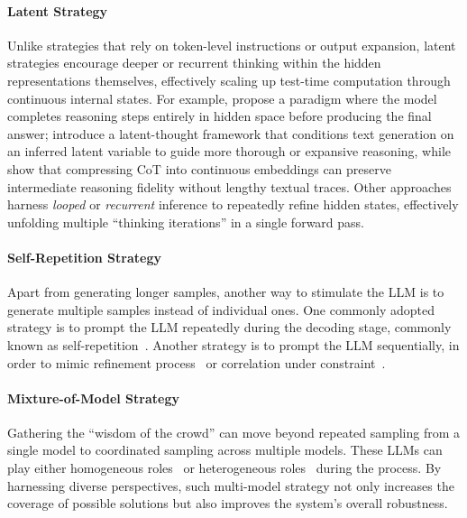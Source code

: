 \paragraph{Latent Strategy}  Unlike strategies that rely on token-level instructions or output expansion, latent strategies encourage deeper or recurrent thinking within the hidden representations themselves, effectively scaling up test-time computation through continuous internal states. For example, \citet{hao2024training} propose a paradigm where the model completes reasoning steps entirely in hidden space before producing the final answer; \citet{kong2025scalablelanguagemodelsposterior} introduce a latent-thought framework that conditions text generation on an inferred latent variable to guide more thorough or expansive reasoning, while \citet{shen2025codicompressingchainofthoughtcontinuous} show that compressing CoT into continuous embeddings can preserve intermediate reasoning fidelity without lengthy textual traces. Other approaches~\citep{saunshi2025reasoninglatentthoughtspower} harness \emph{looped} or \emph{recurrent} inference to repeatedly refine hidden states, effectively unfolding multiple ``thinking iterations'' in a single forward pass. 


\paragraph{Self-Repetition Strategy} Apart from generating longer samples, another way to stimulate the LLM is to generate multiple samples instead of individual ones. One commonly adopted strategy is to prompt the LLM repeatedly during the decoding stage, commonly known as self-repetition~\citep{wang2023selfconsistency}. Another strategy is to prompt the LLM sequentially, in order to mimic refinement process~\citep{madaan2023selfrefine} or correlation under constraint~\citep{ferraz2024llmselfcorrectiondecrimdecompose}. 

\paragraph{Mixture-of-Model Strategy} Gathering the ``wisdom of the crowd'' can move beyond repeated sampling from a single model to coordinated sampling across multiple models. These LLMs can play either homogeneous roles~\citep{wang2025mixtureofagents} or heterogeneous roles~\citep{chen2024braininspiredtwostageapproachenhancing,he2025enhancingllmreasoningmultipath} during the process. By harnessing diverse perspectives, such multi-model strategy not only increases the coverage of possible solutions but also improves the system’s overall robustness. 

